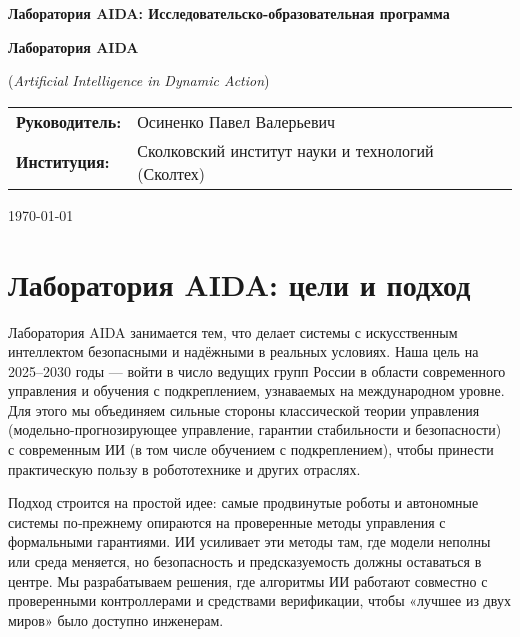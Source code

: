 \documentclass[12pt,a4paper]{article}
\begin{document}
\begin{titlepage}
    \centering
    \vspace*{1cm}
    
    {\Huge\bfseries Лаборатория AIDA: Исследовательско-образовательная программа\par}
    
    \vspace{1.5cm}
    
    {\Large\bfseries Лаборатория AIDA\par}
    {\large (\textit{Artificial Intelligence in Dynamic Action})\par}
    
    \vspace{1.5cm}
    
    \begin{tabular}{ll}
        \textbf{Руководитель:} & Осиненко Павел Валерьевич \\
        \textbf{Институция:} & Сколковский институт науки и технологий (Сколтех)
    \end{tabular}
    
    \vfill
    
    {\large \today\par}
\end{titlepage}

\section{Лаборатория AIDA: цели и подход}

Лаборатория AIDA занимается тем, что делает системы с искусственным интеллектом безопасными и надёжными в реальных условиях. Наша цель на 2025–2030 годы — войти в число ведущих групп России в области современного управления и обучения с подкреплением, узнаваемых на международном уровне. Для этого мы объединяем сильные стороны классической теории управления (модельно-прогнозирующее управление, гарантии стабильности и безопасности) с современным ИИ (в том числе обучением с подкреплением), чтобы принести практическую пользу в робототехнике и других отраслях.

Подход строится на простой идее: самые продвинутые роботы и автономные системы по‑прежнему опираются на проверенные методы управления с формальными гарантиями. ИИ усиливает эти методы там, где модели неполны или среда меняется, но безопасность и предсказуемость должны оставаться в центре. Мы разрабатываем решения, где алгоритмы ИИ работают совместно с проверенными контроллерами и средствами верификации, чтобы «лучшее из двух миров» было доступно инженерам.
\end{document}
